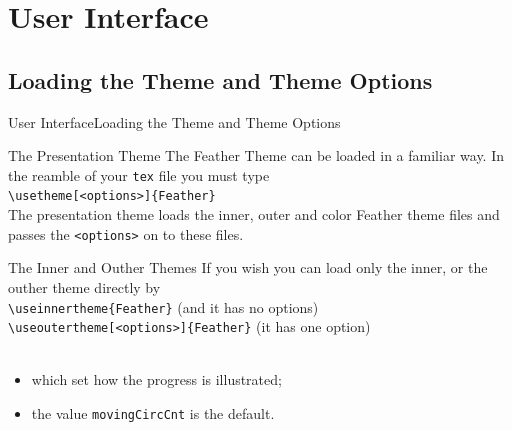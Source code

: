 \documentclass[10pt]{beamer}
\begin{document}
\section{User Interface}
\subsection{Loading the Theme and Theme Options}
\begin{frame}{User Interface}{Loading the Theme and Theme Options}

  \begin{block}{The Presentation Theme}
    The Feather Theme can be loaded in a familiar way. In the reamble of your {\tt tex} file you must type\\ \vspace{5pt} 
    {\tt \textbackslash usetheme[<options>]\{Feather\}}\\ \vspace{5pt} 
    The presentation theme loads the inner, outer and color Feather theme files and passes the {\tt <options>} on to these files.
  \end{block}
  \begin{block}{The Inner and Outher Themes}
    If you wish you can load only the inner, or the outher theme directly by\\ \vspace{5pt} 
    {\tt \textbackslash useinnertheme\{Feather\}} (and it has no options)\\ \vspace{5pt} 
    {\tt \textbackslash useoutertheme[<options>]\{Feather\}} (it has one option)\\
     \\
    \begin{itemize}
    \item which set how the progress is illustrated;
    \item the value {\tt movingCircCnt} is the default.
    \end{itemize}
  \end{block}
\end{frame}
\end{document}
